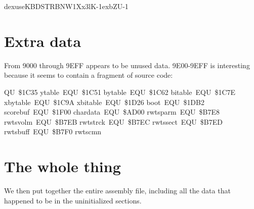 \documentclass[10pt]{report}%
\begin{document}
dexuse{}{KBDSTRB}{NW1Xx3lK-1exbZU-1}\nwendcode{}\nwdocspar

\chapter{Extra data}

From {\Tt{}9000\nwendquote} through {\Tt{}9EFF\nwendquote} appears to be unused data. {\Tt{}9E00-9EFF\nwendquote} is interesting
because it seems to contain a fragment of source code:

{\Tt{}\nwnewline
QU\ {\$}1C35\nwnewline
ytable\ EQU\ {\$}1C51\nwnewline
bytable\ EQU\ {\$}1C62\nwnewline
bitable\ EQU\ {\$}1C7E\nwnewline
xbytable\ EQU\ {\$}1C9A\nwnewline
xbitable\ EQU\ {\$}1D26\nwnewline
boot\ EQU\ {\$}1DB2\nwnewline
scorebuf\ EQU\ {\$}1F00\nwnewline
chardata\ EQU\ {\$}AD00\nwnewline
\nwnewline
rwtsparm\ EQU\ {\$}B7E8\nwnewline
rwtsvolm\ EQU\ {\$}B7EB\nwnewline
rwtstrck\ EQU\ {\$}B7EC\nwnewline
rwtssect\ EQU\ {\$}B7ED\nwnewline
rwtsbuff\ EQU\ {\$}B7F0\nwnewline
rwtscmn\nwnewline
\nwendquote}

\chapter{The whole thing}

We then put together the entire assembly file, including all the data that happened
to be in the uninitialized sections.
\end{document}

